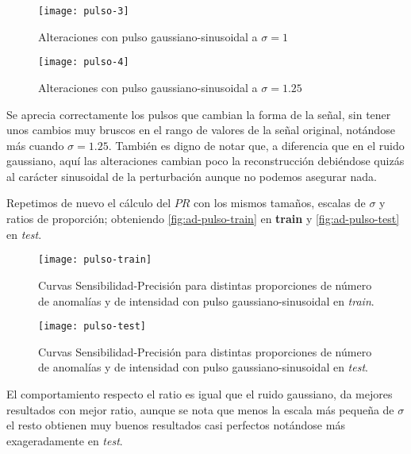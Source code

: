 \begin{figure}[htpb]
  \centering
  \texttt{[image: pulso-3]}
  \caption{Alteraciones con pulso gaussiano-sinusoidal a $\sigma = 1$}
  \label{fig:ad-pulso-3}
\end{figure}

\begin{figure}[htpb]
  \centering
  \texttt{[image: pulso-4]}
  \caption{Alteraciones con pulso gaussiano-sinusoidal a $\sigma = 1.25$}
  \label{fig:ad-pulso-4}
\end{figure}

Se aprecia correctamente los pulsos que cambian la forma de la señal, sin tener unos cambios muy bruscos en el rango de valores de la señal original, notándose más cuando $\sigma = 1.25$. También es digno de notar que, a diferencia que en el ruido gaussiano, aquí las alteraciones cambian poco la reconstrucción debiéndose quizás al carácter sinusoidal de la perturbación aunque no podemos asegurar nada.

Repetimos de nuevo el cálculo del $PR$ con los mismos tamaños, escalas de $\sigma$ y ratios de proporción; obteniendo \autoref{fig:ad-pulso-train} en \textbf{train} y \autoref{fig:ad-pulso-test} en \emph{test}.

\begin{figure}[htpb]
  \centering
  \texttt{[image: pulso-train]}
  \caption{Curvas Sensibilidad-Precisión para distintas proporciones de número de anomalías y de intensidad con pulso gaussiano-sinusoidal en \emph{train}.}
  \label{fig:ad-pulso-train}
\end{figure}

\begin{figure}[htpb]
  \centering
  \texttt{[image: pulso-test]}
  \caption{Curvas Sensibilidad-Precisión para distintas proporciones de número de anomalías y de intensidad con pulso gaussiano-sinusoidal en \emph{test}.}
  \label{fig:ad-pulso-test}
\end{figure}

El comportamiento respecto el ratio es igual que el ruido gaussiano, da mejores resultados con mejor ratio, aunque se nota que menos la escala más pequeña de $\sigma$ el resto obtienen muy buenos resultados casi perfectos notándose más exageradamente en \emph{test}.

